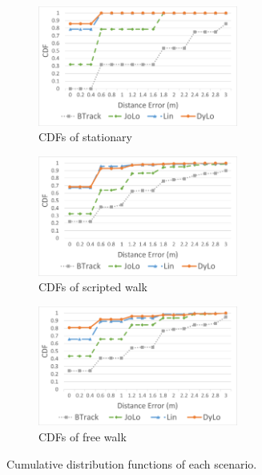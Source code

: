 \documentclass[a4paper,12pt]{report}
\begin{document}
\begin{figure}[tbph]%
    \begin{subfigure}{1\linewidth}
    \centering
        \includegraphics[width=0.72\textwidth]{images/5_1_Comparisons_with_Other_Methods_CDF_ST.png}
        \caption{CDFs of stationary}
        \label{figure:5_1_Comparisons_with_Other_Methods_CDF_ST}
    \end{subfigure}
    \begin{subfigure}{1\linewidth}
    \centering
        \includegraphics[width=0.72\textwidth]{images/5_1_Comparisons_with_Other_Methods_CDF_SW.png}
        \caption{CDFs of scripted walk}
        \label{figure:5_1_Comparisons_with_Other_Methods_CDF_SW}
    \end{subfigure}
    \begin{subfigure}{1\linewidth}
    \centering
        \includegraphics[width=0.72\textwidth]{images/5_1_Comparisons_with_Other_Methods_CDF_FW.png}
        \caption{CDFs of free walk}
        \label{figure:5_1_Comparisons_with_Other_Methods_CDF_FW}
    \end{subfigure}
\caption{Cumulative distribution functions of each scenario.}
\label{figure:5_1_Comparisons_with_Other_Methods_CDF}
\end{figure}
\end{document}
